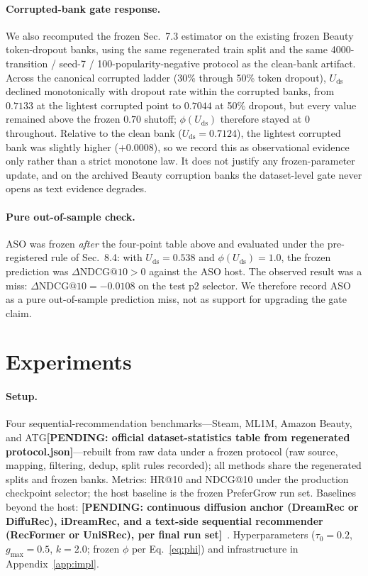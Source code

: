 \documentclass[letterpaper]{article}
\newcommand{\pending}[1]{{\color{red}\textbf{[PENDING: #1]}}}
\newcommand{\Uds}{U_{\mathrm{ds}}}
\newcommand{\phids}{\phi(\Uds)}
\begin{document}
\paragraph{Corrupted-bank gate response.}
We also recomputed the frozen Sec.~7.3 estimator on the existing
frozen Beauty token-dropout banks, using the same regenerated train
split and the same 4000-transition / seed-7 / 100-popularity-negative
protocol as the clean-bank artifact. Across the canonical corrupted
ladder (30\% through 50\% token dropout), $\Uds$ declined monotonically
with dropout rate within the corrupted banks, from $0.7133$ at the
lightest corrupted point to $0.7044$ at 50\% dropout, but every value
remained above the frozen $0.70$ shutoff; $\phids$ therefore stayed at
$0$ throughout. Relative to the clean bank ($\Uds=0.7124$), the
lightest corrupted bank was slightly higher ($+0.0008$), so we record
this as observational evidence only rather than a strict monotone law.
It does not justify any frozen-parameter update, and on the archived
Beauty corruption banks the dataset-level gate never opens as text
evidence degrades.

\paragraph{Pure out-of-sample check.}
ASO was frozen \emph{after} the four-point table above and evaluated
under the pre-registered rule of Sec.~8.4: with
$\Uds{=}0.538$ and $\phids{=}1.0$, the frozen prediction was
$\Delta\mathrm{NDCG}@10 > 0$ against the ASO host. The observed result
was a miss: $\Delta\mathrm{NDCG}@10 = -0.0108$ on the test p2 selector.
We therefore record ASO as a pure out-of-sample prediction miss, not as
support for upgrading the gate claim.

\section{Experiments}
\label{sec:exp}

\paragraph{Setup.}
Four sequential-recommendation benchmarks---Steam, ML1M, Amazon Beauty,
and ATG\pending{official dataset-statistics table from regenerated
protocol.json}---rebuilt from raw data under a frozen protocol (raw
source, mapping, filtering, dedup, split rules recorded); all methods
share the regenerated splits and frozen banks. Metrics: HR@10 and
NDCG@10 under the production checkpoint selector; the host baseline is
the frozen PreferGrow run set. Baselines beyond the host:
\pending{continuous diffusion anchor (DreamRec or DiffuRec), iDreamRec,
and a text-side sequential recommender (RecFormer or UniSRec), per
final run set}~\cite{dreamrec,diffurec,idreamrec,recformer,unisrec}.
Hyperparameters ($\tau_0{=}0.2$, $g_{\max}{=}0.5$, $k{=}2.0$; frozen
$\phi$ per Eq.~\eqref{eq:phi}) and infrastructure in
Appendix~\ref{app:impl}.
\end{document}
